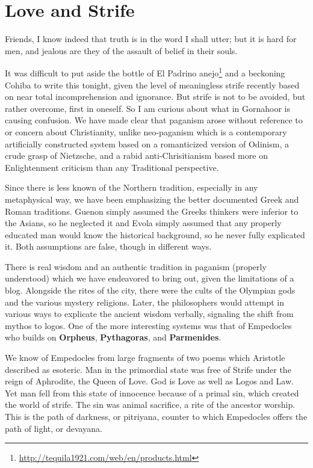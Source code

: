 \section{Love and Strife}

\begin{quotex}
Friends, I know indeed that truth is in the word I shall utter; but it is hard for men, and jealous are they of the assault of belief in their souls.
\end{quotex}

It was difficult to put aside the bottle of El Padrino anejo\footnote{\url{http://tequila1921.com/web/en/products.html}} and a beckoning Cohiba to write this tonight, given the level of meaningless strife recently based on near total incomprehension and ignorance. But strife is not to be avoided, but rather overcome, first in oneself. So I am curious about what in Gornahoor is causing confusion. We have made clear that paganism arose without reference to or concern about Christianity, unlike neo-paganism which is a contemporary artificially constructed system based on a romanticized version of Odinism, a crude grasp of Nietzsche, and a rabid anti-Chrisitianism based more on Enlightenment criticism than any Traditional perspective.

Since there is less known of the Northern tradition, especially in any metaphysical way, we have been emphasizing the better documented Greek and Roman traditions. Guenon simply assumed the Greeks thinkers were inferior to the Asians, so he neglected it and Evola simply assumed that any properly educated man would know the historical background, so he never fully explicated it. Both assumptions are false, though in different ways.

There is real wisdom and an authentic tradition in paganism (properly understood) which we have endeavored to bring out, given the limitations of a blog. Alongside the rites of the city, there were the cults of the Olympian gods and the various mystery religions. Later, the philosophers would attempt in various ways to explicate the ancient wisdom verbally, signaling the shift from mythos to logos. One of the more interesting systems was that of Empedocles who builds on \textbf{Orpheus},
\textbf{Pythagoras}, and \textbf{Parmenides}.

We know of Empedocles from large fragments of two poems which Aristotle described as esoteric. Man in the primordial state was free of Strife under the reign of Aphrodite, the Queen of Love. God is Love as well as Logos and Law. Yet man fell from this state of innocence because of a primal sin, which created the world of strife. The sin was animal sacrifice, a rite of the ancestor worship. This is the path of darkness, or pitriyana, counter to which Empedocles offers the path of light, or devayana.

